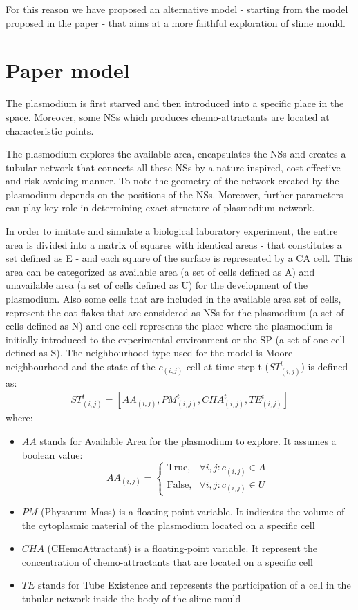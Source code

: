 For this reason we have proposed an alternative model - starting from the model proposed in the paper - that aims at a more faithful exploration of slime mould.

\section{Paper model}
The plasmodium is first starved and then introduced into a specific place in the space. Moreover, some NSs which produces chemo-attractants are located at characteristic points. 
\par
The plasmodium explores the available area, encapsulates the NSs and creates a tubular network that connects all these NSs by a nature-inspired, cost effective and risk avoiding manner. To note the geometry of the network created by the plasmodium depends on the positions of the NSs. Moreover, further parameters can play key role in determining exact structure of plasmodium network.
\par
In order to imitate and simulate a biological laboratory experiment, the entire area is divided into a matrix of squares with identical areas - that constitutes a set defined as E - and each square of the surface is represented by a CA cell.
This area can be categorized as available area (a set of cells defined as A) and unavailable area (a set of cells defined as U) for the development of the plasmodium.
Also some cells that are included in the available area set of cells, represent the oat flakes that are considered as NSs for the plasmodium (a set of cells defined as N) and one cell represents the place where the plasmodium is initially introduced to the
experimental environment or the SP (a set of one cell defined as S). 
The neighbourhood type used for the model is Moore neighbourhood and the state of the $c_{(i, j)}$ cell at time step t ($ ST^t_{(i, j)}$) is defined as:
\begin{align}
ST^t_{(i, j)} = [AA_{(i, j)}, PM^t_{(i, j)}, CHA^t_{(i, j)}, TE^t_{(i, j)}]
\end{align}
where:

\begin{itemize}
	\item $AA$ stands for Available Area for the plasmodium to explore. It assumes a boolean value:  	
\[AA_{(i, j)}=\begin{cases} \mbox{True}, & \forall i, j: c_{(i,j)} \in A \\ \mbox{False}, &  \forall i, j: c_{(i,j)} \in U\end{cases}\]
	\item $PM$ (Physarum Mass) is a floating-point variable. It indicates the volume of the cytoplasmic material of the plasmodium located on a specific cell
	\item $CHA$ (CHemoAttractant) is a floating-point variable. It represent the concentration of chemo-attractants that are located on a specific cell
	\item $TE$ stands for Tube Existence and represents the participation of a cell in the tubular network inside the body of the slime mould
\end{itemize}

